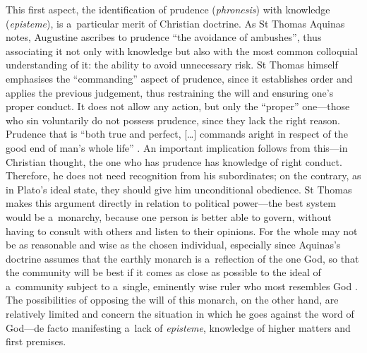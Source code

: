 This first aspect, the identification of prudence (\textit{phronesis}) with knowledge (\textit{episteme}), is a~particular merit of Christian doctrine. As St Thomas Aquinas notes, Augustine ascribes to prudence ``the avoidance of ambushes'', thus associating it not only with knowledge but also with the most common colloquial understanding of it: the ability to avoid unnecessary risk. St Thomas himself emphasises the ``commanding'' aspect of prudence, since it establishes order and applies the previous judgement, thus restraining the will and ensuring one's proper conduct. It does not allow any action, but only the ``proper'' one---those who sin voluntarily do not possess prudence, since they lack the right reason. Prudence that is ``both true and perfect, […] commands aright in respect of the good end of man's whole life'' 
\parencite[][q.47 a.8,13]{thomas_aquinas_summa_1947}. %
 An important implication follows from this---in Christian thought, the one who has prudence has knowledge of right conduct. Therefore, he does not need recognition from his subordinates; on the contrary, as in Plato's ideal state, they should give him unconditional obedience. St Thomas makes this argument directly in relation to political power---the best system would be a~monarchy, because one person is better able to govern, without having to consult with others and listen to their opinions. For the whole may not be as reasonable and wise as the chosen individual, especially since Aquinas's doctrine assumes that the earthly monarch is a~reflection of the one God, so that the community will be best if it comes as close as possible to the ideal of a~community subject to a~single, eminently wise ruler who most resembles God 
\parencite[][]{thomas_aquinas_kingship_1949}. %
 The possibilities of opposing the will of this monarch, on the other hand, are relatively limited and concern the situation in which he goes against the word of God---de facto manifesting a~lack of \textit{episteme}, knowledge of higher matters and first premises.




